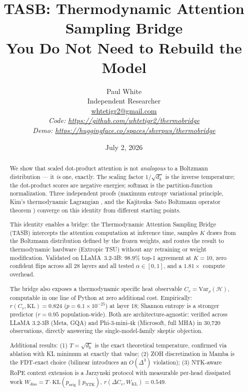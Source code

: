 \documentclass[11pt,a4paper]{article}
\title{\textbf{TASB: Thermodynamic Attention Sampling Bridge}\\[0.5em]
\large You Do Not Need to Rebuild the Model}
\author{Paul White\\[0.3em]
\small Independent Researcher\\
\small \href{mailto:whtetigr2@gmail.com}{whtetigr2@gmail.com}\\[0.3em]
\small \textit{Code: \url{https://github.com/whtetigr2/thermobridge}}\\
\small \textit{Demo: \url{https://huggingface.co/spaces/shvrpws/thermobridge}}
}
\date{July 2, 2026}
\begin{document}
\maketitle

\begin{abstract}
We show that scaled dot-product attention is not \emph{analogous} to a
Boltzmann distribution --- it \emph{is} one, exactly. The scaling factor
$1/\sqrt{d_k}$ is the inverse temperature; the dot-product scores are negative
energies; softmax is the partition-function normalization. Three independent
proofs (maximum entropy variational principle, Kim's thermodynamic Lagrangian
\citep{kim2026thermodynamic}, and the Kajitsuka--Sato Boltzmann operator theorem
\citep{kajitsuka2024transformers}) converge on this identity from different
starting points.

This identity enables a bridge: the Thermodynamic Attention Sampling Bridge
(TASB) intercepts the attention computation at inference time, samples $K$
draws from the Boltzmann distribution defined by the frozen weights, and
routes the result to thermodynamic hardware (Extropic TSU) without any
retraining or weight modification. Validated on LLaMA~3.2-3B: 98.9\% top-1
agreement at $K=10$, zero confident flips across all 28 layers and all tested
$\alpha \in [0,1]$, and a $1.81\times$ compute overhead.

The bridge also exposes a thermodynamic specific heat observable $C_v =
\mathrm{Var}_\rho(\mathcal{H})$, computable in one line of Python at zero
additional cost. Empirically: $r(C_v, \mathrm{KL}) = 0.824$ ($p = 6.1 \times
10^{-25}$) at layer 18; Shannon entropy is a stronger predictor ($r = 0.95$
population-wide). Both are architecture-agnostic: verified across LLaMA 3.2-3B
(Meta, GQA) and Phi-3-mini-4k (Microsoft, full MHA) in 30,720 observations,
directly answering the single-model-family skeptic objection.

Additional results: (1) $T = \sqrt{d_k}$ is the exact theoretical temperature,
confirmed via ablation with KL minimum at exactly that value; (2) ZOH
discretization in Mamba is the FDT-exact choice (bilinear introduces an
$O(\Delta^3)$ violation); (3) NTK-aware RoPE context extension is a Jarzynski
protocol with measurable per-head dissipated work $W_\mathrm{diss} = T \cdot
\mathrm{KL}(p_\mathrm{orig} \| p_\mathrm{NTK})$, $r(\Delta C_v, W_\mathrm{KL})
= 0.549$.
\end{abstract}

\tableofcontents
\newpage

\end{document}

